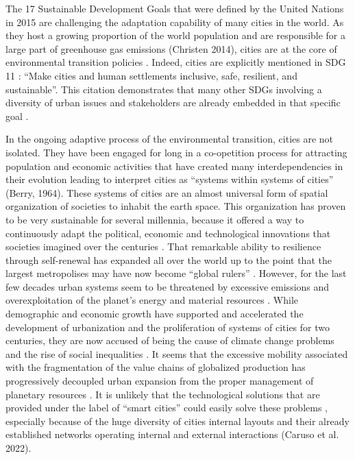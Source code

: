\documentclass[final,5p,times,twocolumn,authoryear]{elsarticle}
\begin{document}
The 17 Sustainable Development Goals that were defined by the United Nations in 2015 \citep{nations2015sustainable} are challenging the adaptation capability of many cities in the world. As they host a growing proportion of the world population and are responsible for a large part of greenhouse gas emissions (Christen 2014), cities are at the core of environmental transition policies \citep{romero2011cities}. Indeed, cities are explicitly mentioned in SDG 11 \citep{nations2015sustainable}: ``Make cities and human settlements inclusive, safe, resilient, and sustainable''. This citation demonstrates that many other SDGs involving a diversity of urban issues and stakeholders are already embedded in that specific goal \citep{vaidya2020sdg}.

In the ongoing adaptive process of the environmental transition, cities are not isolated. They have been engaged for long in a co-opetition process for attracting population and economic activities that have created many interdependencies in their evolution leading to interpret cities as “systems within systems of cities” (Berry, 1964). These systems of cities are an almost universal form of spatial organization of societies to inhabit the earth space. This organization has proven to be very sustainable for several millennia, because it offered a way to continuously adapt the political, economic and technological innovations that societies imagined over the centuries \citep{pumain2020theories}. That remarkable ability to resilience through self-renewal has expanded all over the world up to the point that the largest metropolises may have now become ``global rulers'' \citep{glaeser2020urban}. However, for the last few decades urban systems seem to be threatened by excessive emissions and overexploitation of the planet's energy and material resources \citep{nijkamp2014sustainable,kourtit2020global}. While demographic and economic growth have supported and accelerated the development of urbanization and the proliferation of systems of cities for two centuries, they are now accused of being the cause of climate change problems and the rise of social inequalities \citep{davis2006planet,glaeser2009inequality}. It seems that the excessive mobility associated with the fragmentation of the value chains of globalized production has progressively decoupled urban expansion from the proper management of planetary resources \citep{rozenblat2018urban}. It is unlikely that the technological solutions that are provided under the label of “smart cities” could easily solve these problems \citep{caragliu2011smart,kourtit2020global}, especially because of the huge diversity of cities internal layouts and their already established networks operating internal and external interactions \citep{}(Caruso et al. 2022).
\end{document}
